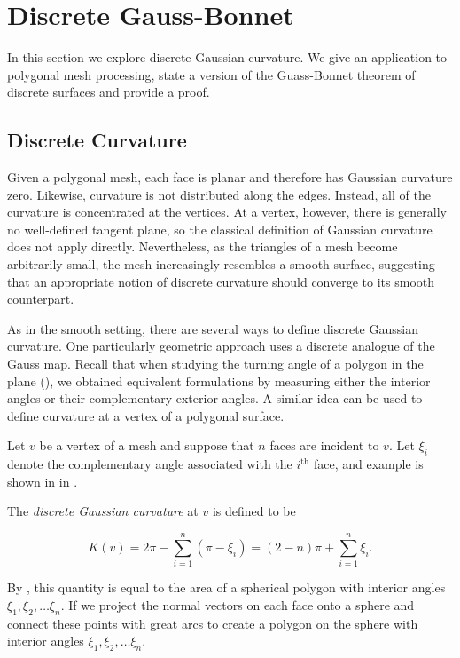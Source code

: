 \section{Discrete Gauss-Bonnet}
\label{sec:discrete}


In this section we explore discrete Gaussian curvature. We give an
application to polygonal mesh processing, state a version of the Guass-Bonnet
theorem of discrete surfaces and provide a proof.

\subsection{Discrete Curvature}

Given a polygonal mesh, each face is planar and therefore has Gaussian curvature zero. Likewise, curvature is not distributed along the edges. Instead, all of the curvature is concentrated at the vertices. At a vertex, however, there is generally no well-defined tangent plane, so the classical definition of Gaussian curvature does not apply directly. Nevertheless, as the triangles of a mesh become arbitrarily small, the mesh increasingly resembles a smooth surface, suggesting that an appropriate notion of discrete curvature should converge to its smooth counterpart.

As in the smooth setting, there are several ways to define discrete Gaussian curvature. One particularly geometric approach uses a discrete analogue of the Gauss map.
Recall that when studying the turning angle of a polygon in the plane (), we obtained equivalent formulations by measuring either the interior angles or their complementary exterior angles. A similar idea can be used to define curvature at a vertex of a polygonal surface.


Let $v$ be a vertex of a mesh and suppose that $n$ faces are incident to $v$.
Let $\xi_i$ denote the complementary angle associated with the $i^{\text{th}}$ face,
and example is shown in  in . 

The \emph{discrete Gaussian curvature} at $v$ is defined to be
\begin{definition}\label{def:discrete-curvature-complement-angle}
$$K(v)=2\pi - \sum_{i=1}^n (\pi - \xi_i)=(2-n)\pi +\sum_{i=1}^n \xi_i.$$
\end{definition}
By , this quantity is equal to the area of a spherical polygon  with interior
angles $\xi_1, \xi_2,\ldots \xi_n.$
If we project the normal vectors on each face onto a sphere and
connect these points with great arcs to create a polygon on the sphere with interior angles
$\xi_1, \xi_2,\ldots \xi_n.$

